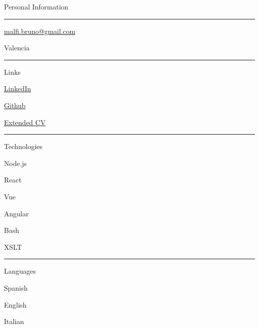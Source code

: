 \documentclass{letter}
\begin{document}
\begin{minipage}[t]{0.40\textwidth}
\setlength{\baselineskip}{1.5\baselineskip}
\color{white}
\vspace{1cm}
{\large Personal Information}

\rule{\linewidth}{0.4pt}

\faPhone \quad  

\faEnvelope \quad \href{malfi.bruno@gmail.com}{malfi.bruno@gmail.com}

\faMapMarker \quad Valencia

\rule{\linewidth}{0.4pt}

{\large Links}

\faLinkedin \quad \href{https://www.linkedin.com/in/bruno-malfi-fabeiro}{LinkedIn}

\faGithub \quad \href{https://github.com/BrunoMalfi}{Github}

\faPaperclip \quad \href{https://github.com/BrunoMalfi/CV/blob/main/CV_EN.md}{Extended CV}

\rule{\linewidth}{0.4pt}

{\large Technologies}

\faNodeJs \quad Node.js

\faReact \quad React

\faVuejs \quad Vue

\faAngular \quad Angular

\faLinux \quad Bash

\faCircleNotch \quad XSLT

\rule{\linewidth}{0.4pt}

{\large Languages}

\faLanguage \quad Spanish

\faLanguage \quad English

\faLanguage \quad Italian

\end{minipage}
\hfill
\end{document}
